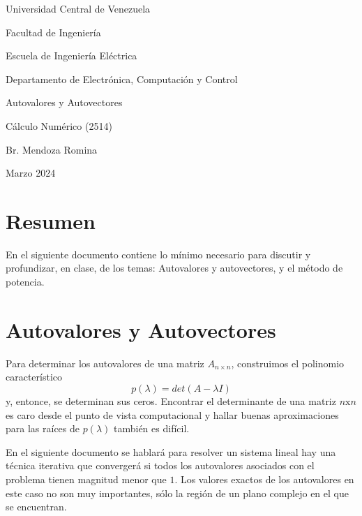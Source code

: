 \documentclass{report}
\numberwithin{subsection}{section} %
\begin{document}
\doublespacing

\begin{titlepage}
    \centering
    {\large Universidad Central de Venezuela \par}
    {\large Facultad de Ingeniería \par}
    {\large Escuela de Ingeniería Eléctrica \par}
    {\large Departamento de Electrónica, Computación y Control \par}
    \vspace*{\fill}
    {\Huge Autovalores y Autovectores \par} %
    {\LARGE Cálculo Numérico (2514) \par}
    \vspace*{\fill}
    \begin{flushright}
    {\Large Br. Mendoza Romina \par}
    \end{flushright}
    \vfill
    {\large Marzo 2024 \par}
\end{titlepage}

\section*{\textnormal{Resumen}} %

En el siguiente documento contiene lo mínimo necesario para discutir y profundizar, en clase, de los temas: Autovalores y autovectores, y el método de potencia.

\section{\textnormal{Autovalores y Autovectores}} %

Para determinar los autovalores de una matriz $ A _{n\times n} $, construimos el polinomio característico 
\begin{equation}
p \left( \lambda \right) = det \left( A - \lambda I \right)
\end{equation}
y, entonce, se determinan sus ceros. Encontrar el determinante de una matriz $ n\text{x}n $ es caro desde el punto de vista computacional y hallar buenas aproximaciones para las raíces de $ p \left( \lambda \right) $ también es difícil.

En el siguiente documento se hablará para resolver un sistema lineal hay una técnica iterativa que convergerá si todos los autovalores asociados con el problema tienen magnitud menor que $ 1 $. Los valores exactos de los autovalores en este caso no son muy importantes, sólo la región de un plano complejo en el que se encuentran.
\end{document}
